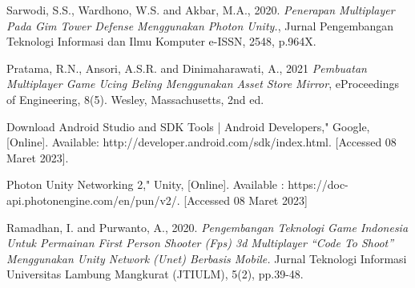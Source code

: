 \documentclass[12pt,a4paper]{report}
\begin{document}



\tableofcontents
{}

\listoftables
\listoffigures


\clearpage

\setcounter{page}{1}







\begin{thebibliography}{9}
Sarwodi, S.S., Wardhono, W.S. and Akbar, M.A., 2020. \emph{Penerapan Multiplayer Pada Gim Tower Defense Menggunakan Photon Unity.}, Jurnal Pengembangan Teknologi Informasi dan Ilmu Komputer e-ISSN, 2548, p.964X.

Pratama, R.N., Ansori, A.S.R. and Dinimaharawati, A., 2021 \emph{Pembuatan Multiplayer Game Ucing Beling Menggunakan Asset Store Mirror}, eProceedings of Engineering, 8(5).
Wesley, Massachusetts, 2nd ed.

Download Android Studio and SDK Tools | Android 
Developers," Google, [Online]. Available: 
http://developer.android.com/sdk/index.html. [Accessed 08 
Maret 2023].

Photon Unity Networking 2," Unity, 
[Online]. Available : https://doc-api.photonengine.com/en/pun/v2/. [Accessed 08 Maret 2023]

Ramadhan, I. and Purwanto, A., 2020. \emph{Pengembangan Teknologi Game Indonesia Untuk Permainan First Person Shooter (Fps) 3d Multiplayer “Code To Shoot” Menggunakan Unity Network (Unet) Berbasis Mobile.} Jurnal Teknologi Informasi Universitas Lambung Mangkurat (JTIULM), 5(2), pp.39-48.
\end{thebibliography}
\end{document}
